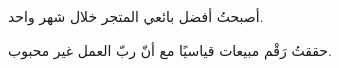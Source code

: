 \begin{achievements}
	\item أصبحتُ أفضل بائعي المتجر خلال شهر واحد.
	\item حققتُ رَقْم مبيعات قياسيًا مع أنّ ربّ العمل غير محبوب.
\end{achievements}
